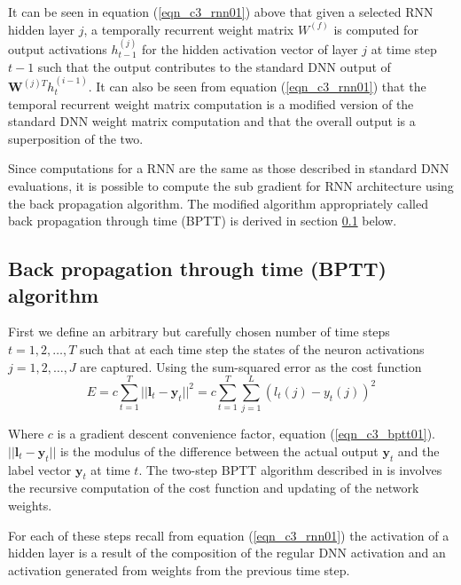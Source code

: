 It can be seen in equation (\ref{eqn_c3_rnn01}) above that given a selected RNN  hidden layer $j$, a temporally recurrent weight matrix $W^{(f)}$ is computed for output activations $h^{(j)}_{t-1}$ for the hidden activation vector of layer $j$ at time step $t - 1$ such that the output contributes to the standard DNN output of  $\mathbf{W}^{(j)T}h_t^{(i-1)}$. It can also be seen from  equation (\ref{eqn_c3_rnn01}) that the temporal recurrent weight matrix computation is a modified version of the standard DNN weight matrix computation and that the overall output is a superposition of the two.

Since computations for a RNN are the same as those described in standard DNN evaluations, it is possible to compute the sub gradient for  RNN architecture using the back propagation algorithm.  The modified algorithm appropriately called back propagation through time (BPTT) \citep{boden2002guide,jaeger2002tutorial} is derived in section \ref{c3_BPTT} below.  

\subsection{Back propagation through time (BPTT) algorithm}\label{c3_BPTT}
First we define an arbitrary but carefully chosen number of time steps $t=1,2,\dots,T$ such that at each time step the states of the neuron activations $j=1,2,\dots,J$ are captured.
Using the sum-squared error as the cost function
\begin{equation}
E=c\sum_{t=1}^T||\mathbf{l}_t-\mathbf{y}_t||^2=c\sum_{t=1}^T\sum_{j=1}^L(l_t(j)-y_t(j))^2 \label{eqn_c3_bptt01}\end{equation}

Where $c$ is a gradient descent convenience factor, equation (\ref{eqn_c3_bptt01}). $||\mathbf{l}_t-\mathbf{y}_t||$ is the modulus of the difference between the actual output $\mathbf{y}_t$ and the label vector $\mathbf{y}_t$ at time $t$. The two-step BPTT algorithm described in \cite{yu2016automatic} is involves the recursive computation of the cost function and updating of the network weights.

For each of these steps recall from equation (\ref{eqn_c3_rnn01}) the activation of a hidden layer is a result of the composition of the regular DNN activation and an activation generated from weights from the previous time step.

